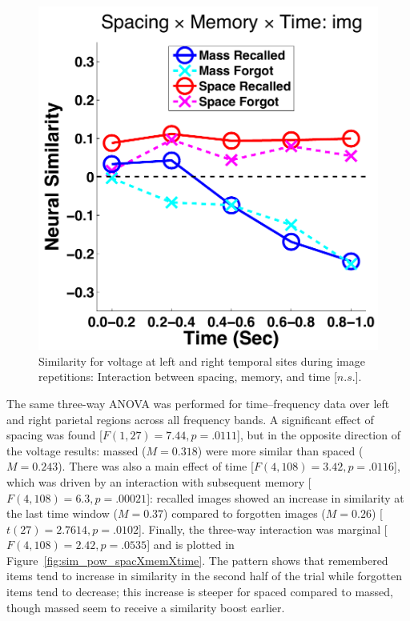 

\begin{figure}
  \centering
  \includegraphics[width=.40\textwidth]{./figs/exp1/similarity_spacXmemXtime_img_tla_LTRT_0to200_200to400_400to600_600to800_800to1000_kaiser_cosine}
  \caption{Similarity for voltage at left and right temporal sites during image repetitions: Interaction between spacing, memory, and time [$n.s.$].}
  \label{fig:sim_tla_spacXmemXtime}
\end{figure}


The same three-way ANOVA was performed for time--frequency data over left and right parietal regions across all frequency bands.  A significant effect of spacing was found [$F(1,27)=7.44, p=.0111$], but in the opposite direction of the voltage results: massed ($M=0.318$) were more similar than spaced ($M=0.243$).  There was also a main effect of time [$F(4,108)=3.42, p=.0116$], which was driven by an interaction with subsequent memory [$F(4,108)=6.3, p=.00021$]: recalled images showed an increase in similarity at the last time window ($M=0.37$) compared to forgotten images ($M=0.26$) [$t(27)=2.7614, p=.0102$].
Finally, the three-way interaction was marginal [$F(4,108)=2.42, p=.0535$] and is plotted in Figure~\ref{fig:sim_pow_spacXmemXtime}.  The pattern shows that remembered items tend to increase in similarity in the second half of the trial while forgotten items tend to decrease; this increase is steeper for spaced compared to massed, though massed seem to receive a similarity boost earlier.

